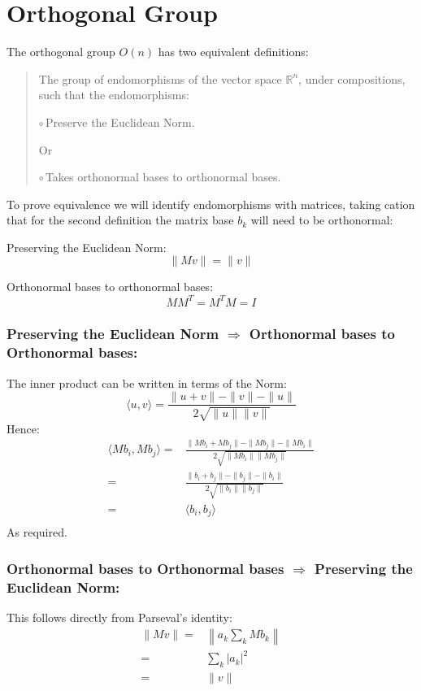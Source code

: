 
\section{Orthogonal Group}
The orthogonal group $O(n)$ has two equivalent definitions:
\begin{quote}
	The group of endomorphisms of the vector space $\mathbb{R}^n$, under compositions, such that the endomorphisms:

	\quad $\circ$\,Preserve the Euclidean Norm.
	
	{\centering Or}

	\quad$\circ$\,Takes orthonormal bases to orthonormal bases.
\end{quote}
To prove equivalence we will identify endomorphisms with matrices,
taking cation that for the second definition the matrix base $b_k$ will need to be orthonormal:

Preserving the Euclidean Norm:
\[\|Mv\| = \|v\|\]

Orthonormal bases to orthonormal bases:
\[MM^T=M^TM=I\]

\subsubsection{Preserving the Euclidean Norm $\Rightarrow$ Orthonormal bases to Orthonormal bases:}
The inner product can be written in terms of the Norm:
\[\langle u,v\rangle = \frac{\|u+v\|-\|v\|-\|u\|}{2\sqrt{\|u\|\|v\|}}\]
Hence:
\begin{equation*}
\begin{aligned}
\langle Mb_i,Mb_j\rangle =&\frac{\|Mb_i+Mb_j\|-\|Mb_j\|-\|Mb_i\|}{2\sqrt{\|Mb_i\|\|Mb_j\|}}\\
 =&\frac{\|b_i+b_j\|-\|b_j\|-\|b_i\|}{2\sqrt{\|b_i\|\|b_j\|}}\\
 =&\langle b_i,b_j\rangle\\
\end{aligned}
\end{equation*}
As required.

\subsubsection{Orthonormal bases to Orthonormal bases $\Rightarrow$ Preserving the Euclidean Norm:}
This follows directly from Parseval's identity:
\begin{equation*}
\begin{aligned}
\|Mv\| =& \left\|a_k\sum_kMb_k\right\| \\
=& \sum_k|a_k|^2\\
=& \|v\|\\
\end{aligned}
\end{equation*}

